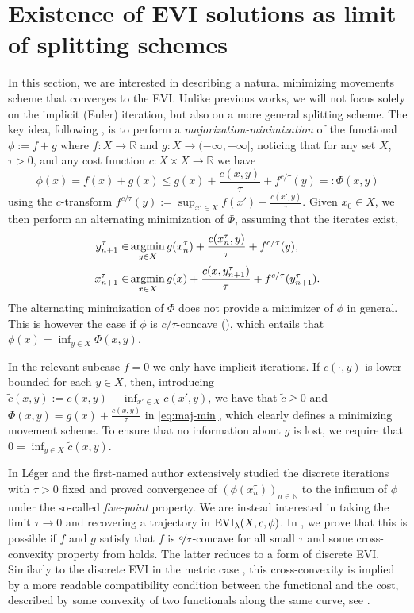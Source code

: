 \documentclass[reqno]{amsart}
\theoremstyle{plain}
\theoremstyle{remark}
\theoremstyle{plain}
\numberwithin{equation}{section}
\theoremstyle{remark}
\newcommand{\N}{\mathbb{N}}
\newcommand{\R}{\mathbb{R}}
\newcommand{\argmin}{\mathop{\rm argmin}\limits}
\DeclareMathOperator{\EVI}{{\rm EVI}}
\begin{document}
\section{Existence of EVI solutions as limit of splitting schemes}
\label{sec:f+g}


In this section, we are interested in describing a natural  minimizing  movements scheme that converges to the EVI. Unlike previous works, we will not focus  solely  on the implicit (Euler) iteration, but also on a more general splitting scheme. The key idea, following \cite{leger2023gradient}, is to perform a {\it majorization-minimization} of the functional $\phi:=f+g$ where $f:X\to\R$ and $g: X\to (-\infty, +\infty]$, noticing that for any set $X$, $\tau>0$, and any cost function $c:X\times  X\to \R$ we have
\begin{equation}\label{eq:maj-min}
    \phi(x)=f(x)+g(x)\le g(x)+\frac{c(x,y)}{\tau}+f^{c/\tau}(y)=: \Phi(x,y)
\end{equation}
using the $c$-transform $f^{c/\tau}(y):=\sup_{x'\in X}f(x')-\frac{c(x',y)}{\tau}$. Given $x_0\in X$, we then perform an alternating minimization of $\Phi$, assuming that the iterates exist,
\begin{align}
    y_{n+1}^\tau \in &\argmin_{y\in  X} g(x_n^\tau)+\frac{c(x_n^\tau,y)}{\tau}+f^{c/\tau}(y), \label{eq:iteration_y}\\
    x_{n+1}^\tau \in &\argmin_{x\in X}g(x)+\frac{c(x,y_{n+1}^\tau)}{\tau}+f^{c/\tau}(y^\tau_{n+1}). \label{eq:iteration_x}
\end{align}
 The alternating minimization of $\Phi$ does not provide a minimizer of $\phi$ in general. This is however the case if $\phi$ is $c/\tau$-concave (), which entails that $\phi(x)=\inf_{y\in X}\Phi(x,y)$.  

 In the relevant  subcase    $f=0$   we only have implicit iterations. If $c(\cdot,y)$ is lower bounded for each $y\in  X$, then, introducing $\tilde c(x,y):=c(x,y)-\inf_{x'\in X}c(x',y)$, we have that  
$\tilde c\ge 0$ and $\Phi(x,y)=g(x)+\frac{\tilde c(x,y)}{\tau}$ in \eqref{eq:maj-min},  which clearly defines a minimizing movement scheme. To ensure that no information about $g$ is lost, we require that  $0=\inf_{y\in  X  }\tilde c(x,y)$.

In \cite{leger2023gradient} Léger and the first-named author extensively studied the discrete iterations with $\tau>0$ fixed and proved convergence of $(\phi(x_n^\tau))_{n\in \N}$ to the infimum of $\phi$ under  the so-called {\it five-point}   property. We are instead interested  in  taking the limit $\tau\to 0$ and recovering  a trajectory in  $\EVI_\lambda(X,c,\phi)$.  In , we prove that this is possible if  
$f$ and $g$ satisfy that $f$ is $\nicefrac{c}{\tau}$-concave for all small $\tau$ and  some 
cross-convexity property from  
\cite{leger2023gradient}  holds. The latter reduces  to a form of discrete EVI. Similarly to the discrete EVI in the metric case \cite{Ambrosio2012userguide}, this cross-convexity is implied by a more readable compatibility condition between the functional and the cost,  described by  
some convexity of two functionals along the same curve, see . 
\end{document}
